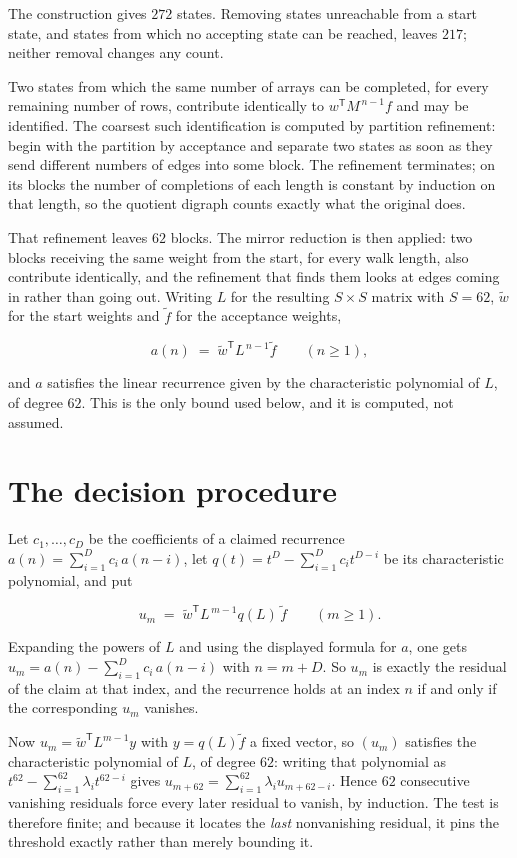 \documentclass[11pt]{article}
\theoremstyle{definition}
\begin{document}
The construction gives $272$ states. Removing states unreachable from a start state, and states from which no accepting state can be reached, leaves $217$; neither removal changes any count.

Two states from which the same number of arrays can be completed, for every remaining number of rows, contribute identically to $w^{\mathsf T}M^{\,n-1}f$ and may be identified. The coarsest such identification is computed by partition refinement: begin with the partition by acceptance and separate two states as soon as they send different numbers of edges into some block. The refinement terminates; on its blocks the number of completions of each length is constant by induction on that length, so the quotient digraph counts exactly what the original does.

That refinement leaves $62$ blocks. The mirror reduction is then applied: two blocks receiving the same weight from the start, for every walk length, also contribute identically, and the refinement that finds them looks at edges coming in rather than going out. Writing $L$ for the resulting $S \times S$ matrix with $S = 62$, $\tilde w$ for the start weights and $\tilde f$ for the acceptance weights,

\[a(n) \;=\; \tilde w^{\mathsf T} L^{\,n-1} \tilde f \qquad (n \ge 1),\]

and $a$ satisfies the linear recurrence given by the characteristic polynomial of $L$, of degree $62$. This is the only bound used below, and it is computed, not assumed.

\section{The decision procedure}

Let $c_1,\dots,c_D$ be the coefficients of a claimed recurrence $a(n) = \sum_{i=1}^{D} c_i\,a(n-i)$, let $q(t) = t^{D} - \sum_{i=1}^{D} c_i t^{D-i}$ be its characteristic polynomial, and put

\[u_m \;=\; \tilde w^{\mathsf T} L^{\,m-1} q(L)\,\tilde f \qquad (m \ge 1).\]

Expanding the powers of $L$ and using the displayed formula for $a$, one gets $u_m = a(n) - \sum_{i=1}^{D} c_i\,a(n-i)$ with $n = m + D$. So $u_m$ is exactly the residual of the claim at that index, and the recurrence holds at an index $n$ if and only if the corresponding $u_m$ vanishes.

Now $u_m = \tilde w^{\mathsf T} L^{m-1} y$ with $y = q(L)\tilde f$ a fixed vector, so $(u_m)$ satisfies the characteristic polynomial of $L$, of degree $62$: writing that polynomial as $t^{62} - \sum_{i=1}^{62} \lambda_i t^{62-i}$ gives $u_{m+62} = \sum_{i=1}^{62} \lambda_i u_{m+62-i}$. Hence $62$ consecutive vanishing residuals force every later residual to vanish, by induction. The test is therefore finite; and because it locates the {\itshape last} nonvanishing residual, it pins the threshold exactly rather than merely bounding it.
\end{document}
